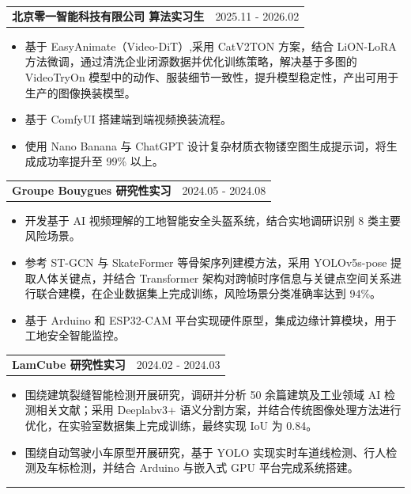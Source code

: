 \documentclass[UTF8]{article}
\begin{document}
\begin{tabularx}{\linewidth}{X r}
    \normalsize \textbf{北京零一智能科技有限公司 算法实习生} & 2025.11 - 2026.02 \\
\end{tabularx}
\begin{itemize}[leftmargin=1.6em, itemsep=0em, topsep=0.05em, parsep=0pt]
    \item 基于 EasyAnimate（Video-DiT）,采用 CatV2TON 方案，结合 LiON-LoRA 方法微调，通过清洗企业闭源数据并优化训练策略，解决基于多图的 VideoTryOn 模型中的动作、服装细节一致性，提升模型稳定性，产出可用于生产的图像换装模型。
    \item 基于 ComfyUI 搭建端到端视频换装流程。
    \item 使用 Nano Banana 与 ChatGPT 设计复杂材质衣物镂空图生成提示词，将生成成功率提升至 99\% 以上。
\end{itemize}

\begin{tabularx}{\linewidth}{X r}
    \normalsize \textbf{Groupe Bouygues 研究性实习} & 2024.05 - 2024.08 \\
\end{tabularx}
\begin{itemize}[leftmargin=1.6em, itemsep=0em, topsep=0.05em, parsep=0pt]
    \item 开发基于 AI 视频理解的工地智能安全头盔系统，结合实地调研识别 8 类主要风险场景。
    \item 参考 ST-GCN 与 SkateFormer 等骨架序列建模方法，采用 YOLOv5s-pose 提取人体关键点，并结合 Transformer 架构对跨帧时序信息与关键点空间关系进行联合建模，在企业数据集上完成训练，风险场景分类准确率达到 94\%。
    \item 基于 Arduino 和 ESP32-CAM 平台实现硬件原型，集成边缘计算模块，用于工地安全智能监控。
\end{itemize}

\begin{tabularx}{\linewidth}{X r}
    \normalsize \textbf{LamCube 研究性实习} & 2024.02 - 2024.03 \\
\end{tabularx}
\begin{itemize}[leftmargin=1.6em, itemsep=0em, topsep=0.05em, parsep=0pt]
    \item 围绕建筑裂缝智能检测开展研究，调研并分析 50 余篇建筑及工业领域 AI 检测相关文献；采用 Deeplabv3+ 语义分割方案，并结合传统图像处理方法进行优化，在实验室数据集上完成训练，最终实现 IoU 为 0.84。
    \item 围绕自动驾驶小车原型开展研究，基于 YOLO 实现实时车道线检测、行人检测及车标检测，并结合 Arduino 与嵌入式 GPU 平台完成系统搭建。
\end{itemize}
\vspace{0.15em}
\hrule
\vspace{0.2em}
\end{document}
